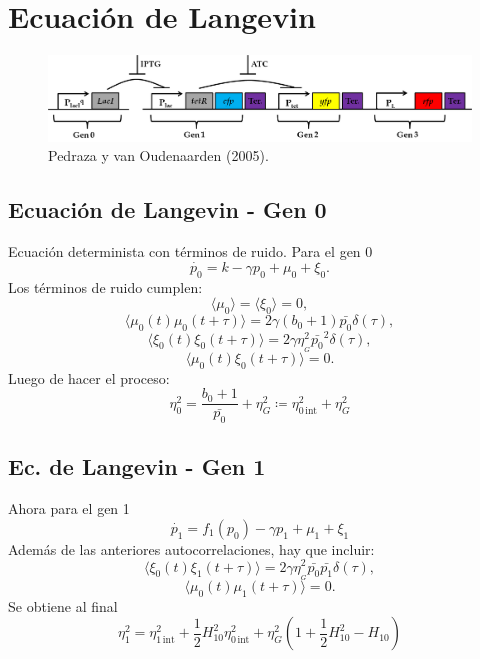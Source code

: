 \documentclass[xcolor=dvipsnames]{beamer}
\begin{document}
\section{Ecuaci\'on de Langevin}

\begin{frame}
\begin{figure}[p]
    \centering
    \includegraphics[width=\textwidth]{Pcon-circuit_simple}\\
    \tiny Pedraza y van Oudenaarden (2005).
\end{figure}
\end{frame}

\subsection{Ecuaci\'on de Langevin - Gen 0}
\begin{frame}
Ecuaci\'on determinista con t\'erminos de ruido. Para el gen 0
$$\dot{p_0} = k - \gamma p_0 + \mu_0 + \xi_{0}.$$
Los t\'erminos de ruido cumplen:
$$\langle \mu_0 \rangle = \langle \xi_0 \rangle = 0,$$
$$\langle \mu_0(t)\mu_0(t+\tau) \rangle  = 2\gamma (b_0+1) \bar{p_0} \delta(\tau),$$
$$\langle \xi_0(t)\xi_0(t+\tau) \rangle = 2 \gamma \eta_{_G}^2\bar{p_0}^2 \delta(\tau),$$
$$\langle \mu_0(t)\xi_0(t+\tau) \rangle = 0.$$
Luego de hacer el proceso:
$$\eta_0^2=\frac{b_0+1}{\bar{p_0}} + \eta_{G}^2\coloneqq\eta_{0\,\text{int}}^2+\eta_{G}^2$$
\end{frame}

\subsection{Ec. de Langevin - Gen 1}
\begin{frame}
Ahora para el gen 1
$$\dot{p_1} = f_1(p_{0}) - \gamma p_1 + \mu_1 + \xi_1$$
Adem\'as de las anteriores autocorrelaciones, hay que incluir:
$$\langle \xi_0(t)\xi_1(t+\tau) \rangle = 2 \gamma \eta_{_G}^2\bar{p_0}\bar{p_1}\delta(\tau),$$
$$\langle \mu_0(t)\mu_1(t+\tau) \rangle =0.$$
Se obtiene al final
$$\eta_1^2 = \eta_{1\,\text{int}}^2 + \frac{1}{2} H_{10}^2 \eta_{0\,\text{int}}^2 + \eta_G^2\left( 1 + \frac{1}{2} H_{10}^2 - H_{10} \right)$$
\end{frame}
\end{document}
